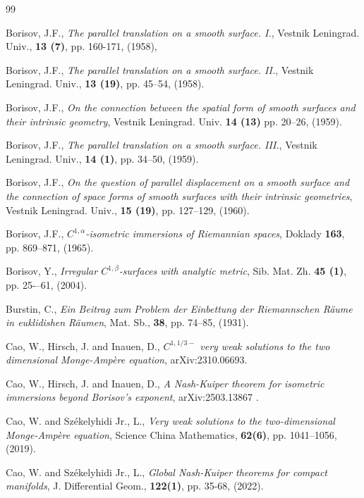 \documentclass[reqno,twoside,11pt]{amsart}
\numberwithin{equation}{section}
\theoremstyle{plain}
\theoremstyle{definition}
\begin{document}
\begin{thebibliography}{99}

 {\sc Borisov, J.F.}, {\em The parallel translation on a
    smooth surface. I.}, Vestnik Leningrad. Univ., {\bf 13 (7)}, pp. 160-171, (1958),

 {\sc Borisov, J.F.}, {\em The parallel translation on a
    smooth surface. II.}, Vestnik Leningrad. Univ., {\bf 13 (19)}, pp.
  45--54, (1958).
 
 {\sc Borisov, J.F.}, {\em On the connection between the
    spatial form of smooth surfaces and their intrinsic
    geometry}, Vestnik Leningrad. Univ. {\bf 14 (13)} pp. 20--26, (1959).

 {\sc Borisov, J.F.}, {\em The parallel translation on a
    smooth surface. III.}, Vestnik Leningrad. Univ., {\bf 14 (1)},
  pp. 34--50, (1959).

 {\sc Borisov, J.F.}, {\em On the question of parallel
    displacement on a smooth surface and the connection of space forms
    of smooth surfaces with their intrinsic geometries}, Vestnik
    Leningrad. Univ., {\bf 15 (19)}, pp. 127--129, (1960).

 {\sc Borisov, J.F.}, {\em $C^{1,\alpha}$-isometric immersions of Riemannian
spaces}, Doklady {\bf 163}, pp. 869--871, (1965).

 {\sc Borisov, Y.}, {\em Irregular
    $C^{1,\beta}$-surfaces with analytic metric}, Sib. Mat. Zh. {\bf
    45 (1)}, pp. 25-–61, (2004).

 {\sc Burstin, C.}, {\em Ein Beitrag zum Problem der
    Einbettung der Riemannschen R\"aume in
euklidishen R\"aumen}, Mat. Sb., {\bf 38}, pp. 74--85, (1931).

 {\sc Cao, W., Hirsch, J. and Inauen, D.}, 
{\em $C^{1,1/3-}$ very weak solutions to the two dimensional
  Monge-Amp\`ere equation}, arXiv:2310.06693.

 {\sc Cao, W., Hirsch, J. and Inauen, D.}, 
{\em A Nash-Kuiper theorem for isometric immersions beyond Borisov's
  exponent}, arXiv:2503.13867 .

 {\sc Cao, W. and Sz\'ekelyhidi Jr., L.}, {\em Very weak
    solutions to the two-dimensional Monge-Amp\`ere equation}, 
  Science China Mathematics, {\bf 62(6)}, pp. 1041--1056, (2019).

 {\sc Cao, W. and Sz\'ekelyhidi Jr., L.}, {\em Global
    Nash-Kuiper theorems for compact manifolds}, 
 J. Differential Geom., {\bf 122(1)}, pp. 35-68, (2022).


\end{thebibliography}
\end{document}
